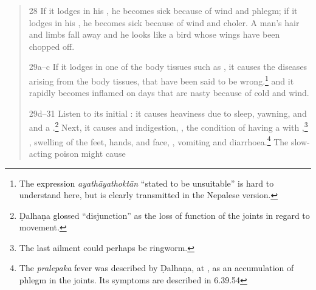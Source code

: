 \begin{translation}
\begin{verse}
        
        



        \item[28]
        If it lodges in his , he becomes sick because of wind 
        and phlegm; if it lodges in his , he becomes sick 
        because of  wind and 
        choler.  A man's hair and limbs fall away and he looks like a
        bird whose wings have been chopped off.
        \item[29a--c]
        If it lodges in one of the body tissues such as 
        , it causes the diseases arising
        from the body tissues, that have been said to be wrong.\footnote{The 
        expression \emph{ayathāyathoktān} “stated to be unsuitable” is hard to 
        understand here, but is clearly transmitted in the Nepalese version.}
        and it rapidly becomes inflamed on days that are nasty
        because of cold and wind.
        
        \item[29d--31] Listen to its initial : it causes
heaviness due to sleep, yawning,  and
 and a .\footnote{Ḍalhaṇa  glossed “disjunction” as the
loss of function of the joints in regard to movement.} Next, it causes
 and indigestion, , the condition of having a  with
,\footnote{The last ailment could perhaps be
ringworm.} %
, swelling of the feet, hands, and
face, , vomiting and
diarrhoea.\footnote{The \emph{pralepaka} fever was described by Ḍalhaṇa,
at , as an accumulation of phlegm in the joints.  Its
symptoms are described in 6.39.54} The slow-acting poison might cause
        

\end{verse}
\end{translation}
